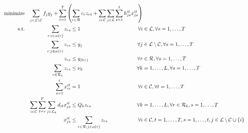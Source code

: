                 \begin{alignat}{3}
                    \text{minimize} &&\sum_{j\in \loc \setminus \cu} f_{j} y_{j} +\sum_{t=1}^{T} \left( \sum_{r\in \ro} c_r z_{rt} + \sum_{i\in \cu} \sum_{j\in\loc}\sum_{s=1}^t h^{it}_{js}x^{it}_{js}\right)\span\span\label{objfunct2}\\ 
    \text{s.t.}  %
    &&\sum_{r : i\in\alpha(r)} z_{rs} &\leq 1 															&\forall i&\in \loc, \forall s=1,\ldots,T  \label{const:singleroutecustomers2}\\
    &&\sum_{r : j\in\alpha(r)} z_{rs} &\leq y_j 															&\forall j&\in \loc\setminus \cu, \forall s=1,\ldots,T  \label{const:singleroutedc2}\\
    &&z_{rs} 					&\leq y_{\beta(r)} 													&\forall r&\in \ro, \forall s=1,\ldots,T\label{const:startfromopendepots2}\\
    &&\sum_{r\in \ro_k} z_{rs} &\leq 	\nu_k													&\forall k&=1,\ldots,L, \forall s=1,\ldots,T  \label{const:fleetcapa2}\\
    &&\sum_{s=1}^t x^{it}_{is}   		& = 1 														&\forall i&\in \cu, \forall t=1,\ldots, T\label{const:satdemands}\\
    &&\sum_{i\in\cu}\sum_{t=s}^T\sum_{j\in \loc_k} d_{it} x^{it}_{js}   		&\leq Q_k z_{rs} 														&\forall k&=1,\ldots,L, \forall r\in \ro_k, s=1,\ldots,T\label{const:deliveryUB2}\\
    &&x^{it}_{js}   		&\leq \sum_{r\in\ro : j\in\alpha(r)} z_{rs}													&\forall i&\in \cu, t=1,\ldots,T, s=1,\ldots,t,j\in\loc\setminus\cu\cup\{i\}\label{const:deliveryConstLoc2}\\

\end{alignat}
